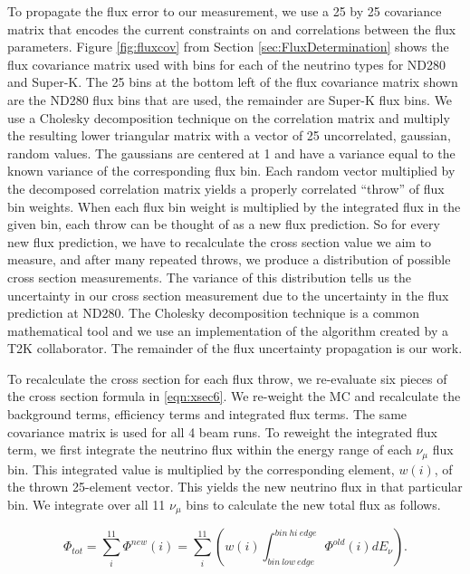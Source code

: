 To propagate the flux error to our measurement, we use a 25 by 25 covariance matrix that encodes the current constraints on and correlations between the flux parameters. Figure \ref{fig:fluxcov} from Section \ref{sec:FluxDetermination} shows the flux covariance matrix used with bins for each of the neutrino types for ND280 and Super-K. The 25 bins at the bottom left of the flux covariance matrix shown are the ND280 flux bins that are used, the remainder are Super-K flux bins. We use a Cholesky decomposition technique \cite{chol} on the correlation matrix and multiply the resulting lower triangular matrix with a vector of 25 uncorrelated, gaussian, random values. The gaussians are centered at 1 and have a variance equal to the known variance of the corresponding flux bin. Each random vector multiplied by the decomposed correlation matrix yields a properly correlated ``throw'' of flux bin weights. When each flux bin weight is multiplied by the integrated flux in the given bin, each throw can be thought of as a new flux prediction. So for every new flux prediction, we have to recalculate the cross section value we aim to measure, and after many repeated throws, we produce a distribution of possible cross section measurements. The variance of this distribution tells us the uncertainty in our cross section measurement due to the uncertainty in the flux prediction at ND280. The Cholesky decomposition technique is a common mathematical tool and we use an implementation of the algorithm created by a T2K collaborator. The remainder of the flux uncertainty propagation is our work.

To recalculate the cross section for each flux throw, we re-evaluate six pieces of the cross section formula in \ref{eqn:xsec6}. We re-weight the MC and recalculate the background terms, efficiency terms and integrated flux terms. The same covariance matrix is used for all 4 beam runs. To reweight the integrated flux term, we first integrate the neutrino flux within the energy range of each $\nu_\mu$ flux bin. This integrated value is multiplied by the corresponding element, $w(i)$, of the thrown 25-element vector. This yields the new neutrino flux in that particular bin. We integrate over all 11 $\nu_\mu$ bins to calculate the new total flux as follows.

\begin{equation}
\Phi_{tot} = \sum_{i}^{11} \Phi^{new}(i) = \sum_{i}^{11} \left( w(i) \int^{bin\:hi\:edge}_{bin\:low\:edge} \Phi^{old}(i) dE_\nu \right).
\end{equation}

